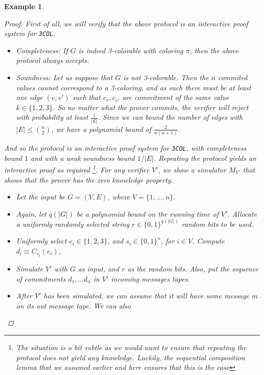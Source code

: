 \documentclass{article}
\newtheorem{example}{Example}
\begin{document}
\begin{example}
    \begin{proof}
        First of all, we will verify that the above protocol is an interactive proof system for \texttt{3COL}.
        \begin{itemize}
            \item Completeness: If $G$ is indeed 3-colorable with coloring $\pi$, then the above protocol always accepts.
            \item Soundness: Let us suppose that $G$ is not 3-colorable. Then the $n$ commited values cannot 
                            correspond to a 3-coloring, and as such there must be at least one edge $(v, v')$ such that
                            $c_v, c_{v'}$ are commitment of the same value $k \in \{1, 2, 3\}$. So no matter what the 
                            prover commits, the verifier will reject with probability at least $\frac{1}{|E|}$. Since we can bound 
                            the number of edges with $|E| \leq \binom{n}{2}$, we have a polynomial bound of $\frac{2}{n(n+1)}$.
        \end{itemize}
        And so the protocol is an interactive proof system for \texttt{3COL}, with completeness bound $1$ and 
        with a weak soundness bound $1/|E|$. Repeating the protocol yields an interactive proof as required
        \footnote{The situation is a bit subtle as we would want to ensure that repeating the protocol does not yield any knowledge.
        Luckily, the sequential composition lemma that we assumed earlier and here ensures that this is the case}. 
        For any verifier $V'$, we show a simulator $M_{V'}$ that shows that the prover has the zero knowledge property.
        \begin{itemize}
            \item Let the input be $G = (V, E)$, where $V = \{1, \dots, n \}$.
            \item Again, let $q(|G|)$ be a polynomial bound on the running time of $V'$. Allocate a uniformly randomly selected string $r \in \{0, 1\}^{q(|G|)}$ random bits to be used.
            \item Uniformly select $e_i \in \{1, 2, 3\}$, and $s_i \in \{ 0, 1\}^n$, for $i \in V$. Compute $d_i \equiv C_{s_i}(e_i)$, 
            \item Simulate $V'$ with $G$ as input, and $r$ as the random bits. Also, put the sequence of commitments $d_1, \dots d_n$ in $V'$ incoming messages tapes.
            \item After $V'$ has been simulated, we can assume that it will have some message $m$ on its out message tape. We can also

\end{itemize}
\end{proof}
\end{example}
\end{document}
